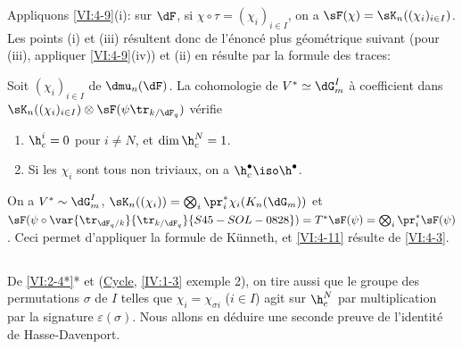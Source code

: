 Appliquons \ref{VI:4-9}(i): sur $\dF$, si $\chi\circ \tau=(\chi_i)_{i\in I}$, 
on a $\sF(\chi) = \sK_n((\chi_i)_{i\in I})$. Les points (i) et (iii) 
résultent donc de l'énoncé plus géométrique suivant (pour (iii), 
appliquer \ref{VI:4-9}(iv)) et (ii) en résulte par la formule des traces: 





\begin{proposition_}\label{VI:4-11}
Soit $(\chi_i)_{i\in I}$  de $\dmu_n(\dF)$. La 
cohomologie de $V^\ast\simeq \dG_m^I$ à coefficient dans 
$\sK_n((\chi_i)_{i\in I})\otimes \sF(\psi\tr_{k/\dF_q})$ vérifie 
\begin{enumerate}[\indent (i)]
  \item $\h_c^i{}=0$ pour $i\ne N$, et $\dim \h_c^N{} = 1$. 
  \item Si les $\chi_i$ sont tous non triviaux, on a 
    $\h_c^\bullet{}\iso \h^\bullet$. 
\end{enumerate}
\end{proposition_}

On a $V^\ast\sim \dG_m^I$, 
$\sK_n((\chi_i)) = \bigotimes_i \pr_i^\ast \chi_i(K_n(\dG_m))$ et 
$\sF(\psi\circ \var{\tr_{\dF_q/k}}{\tr_{k/\dF_q}}{S45-SOL-0828})=T^\ast \sF(\psi) = \bigotimes_i \pr_i^\ast \sF(\psi)$. 
Ceci permet d'appliquer la formule de K\"unneth, et \ref{VI:4-11} résulte de 
\ref{VI:4-3}. 





\subsection{}\label{VI:4-12}

De \ref{VI:2-4*}* et (\hyperref[IV]{Cycle}, \ref{IV:1-3} exemple 2), on tire 
aussi que le groupe des permutations $\sigma$ de $I$ telles que 
$\chi_i = \chi_{\sigma i}$ ($i\in I$) agit sur $\h_c^N$ par multiplication par 
la signature $\varepsilon(\sigma)$. Nous allons en déduire une seconde preuve 
de l'identité de Hasse-Davenport. 

